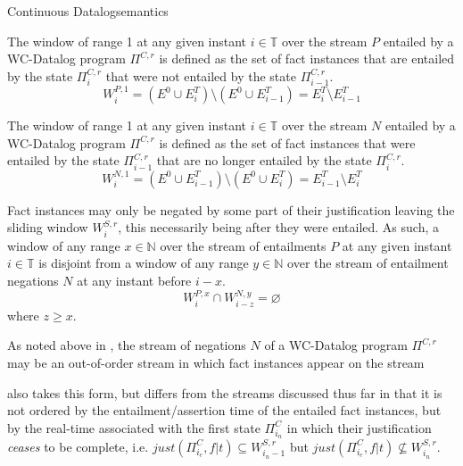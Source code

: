 \begin{nestedsection}{Continuous Datalog}{semantics}
\begin{axiom}
\label{axiom:continuous datalog: positive window increment}
The window of range 1 at any given instant ${i \in \mathbb{T}}$ over
the stream $P$ entailed by a WC-Datalog program $\Pi^{C,r}$ is defined
as the set of fact instances that are entailed by the state
$\Pi^{C,r}_i$ that were not entailed by the state $\Pi^{C,r}_{i-1}$.
\begin{equation*}
W^{P,1}_{i} = \left( E^0 \cup E^T_{i} \right) \setminus
\left( E^0 \cup E^T_{i-1} \right) = E^T_{i} \setminus E^T_{i-1}
\end{equation*}
\end{axiom}

\begin{axiom}
\label{axiom:continuous datalog: negative window increment}
The window of range 1 at any given instant ${i \in \mathbb{T}}$ over
the stream $N$ entailed by a WC-Datalog program $\Pi^{C,r}$ is defined
as the set of fact instances that were entailed by the state
$\Pi^{C,r}_{i-1}$ that are no longer entailed by the state
$\Pi^{C,r}_i$.
\begin{equation*}
W^{N,1}_{i} = \left( E^0 \cup E^T_{i-1} \right) \setminus
\left( E^0 \cup E^T_{i} \right) = E^T_{i-1} \setminus E^T_{i}
\end{equation*}
\end{axiom}

\begin{axiom}
\label{axiom:continuous datalog: entailment precedes negation}
Fact instances may only be negated by some part of their justification
leaving the sliding window $W^{S,r}_{i}$, this necessarily being after
they were entailed.  As such, a window of any range ${x \in
  \mathbb{N}}$ over the stream of entailments $P$ at any given instant
${i \in \mathbb{T}}$ is disjoint from a window of any range ${y \in
  \mathbb{N}}$ over the stream of entailment negations $N$ at any
instant before ${i - x}$.
\begin{equation*}
  W^{P,x}_{i} \cap W^{N,y}_{i-z} = \varnothing
\end{equation*}
where $z \geq x$.
\end{axiom}

As noted above in , the stream of
negations $N$ of a WC-Datalog program $\Pi^{C,r}$ may be an
out-of-order stream in which fact instances appear on the stream 

also takes this form, but differs from the streams
discussed thus far in that it is not ordered by the entailment/assertion
time of the entailed fact instances, but by the real-time associated
with the first state $\Pi^C_{i_{n}}$ in which their justification
\emph{ceases} to be complete, i.e. ${just(\Pi^C_{i_{e}}, f|t) \subseteq W^{S,r}_{i_n - 1}}$
but ${just(\Pi^C_{i_{e}}, f|t) \not\subseteq W^{S,r}_{i_n}}$.


\end{nestedsection}
